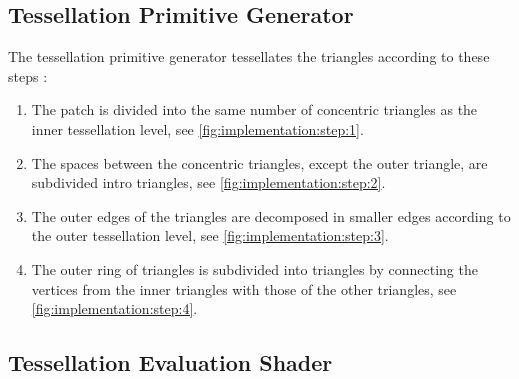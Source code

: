 \subsection{Tessellation Primitive Generator}
\label{ss:implementation:tpg}
	The tessellation primitive generator tessellates the triangles according to these steps \cite{cozzi2012opengl}:
		\begin{enumerate}[label=(\roman*)]
			\item \label{it:implementation:1} The patch is divided into the same number of concentric triangles as the inner tessellation level, see \cref{fig:implementation:step:1}.
			\item \label{it:implementation:2} The spaces between the concentric triangles, except the outer triangle, are subdivided intro triangles, see \cref{fig:implementation:step:2}.
			\item \label{it:implementation:3} The outer edges of the triangles are decomposed in smaller edges according to the outer tessellation level, see \cref{fig:implementation:step:3}.
			\item \label{it:implementation:4} The outer ring of triangles is subdivided into triangles by connecting the vertices from the inner triangles with those of the other triangles, see \cref{fig:implementation:step:4}.
		\end{enumerate}



\subsection{Tessellation Evaluation Shader}
\label{ss:implementation:tes}


